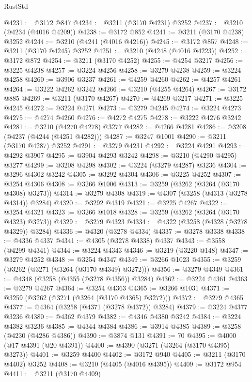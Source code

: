 \begin{lexlean}{RustStd}
\begin{coremodule}
@4231 := @3172 @847
@4234 := @3211 (@3170 @4231) @3252
@4237 := @3210 (@4234 (@4016 @4209))
@4238 := @3172 @852
@4241 := @3211 (@3170 @4238) @3252
@4244 := @3210 (@4241 (@4016 @4216))
@4245 := @3172 @857
@4248 := @3211 (@3170 @4245) @3252
@4251 := @3210 (@4248 (@4016 @4223))
@4252 := @3172 @872
@4254 := @3211 (@3170 @4252)
@4255 := @4254 @3217
@4256 := @3225 @4238
@4257 := @3224 @4256
@4258 := @3279 @4238
@4259 := @3224 @4258
@4260 := @3906 @3237
@4261 := @4259 @4260
@4262 := @4257 @4261
@4264 := @3222 @4262 @3242
@4266 := @3210 (@4255 @4264)
@4267 := @3172 @885
@4269 := @3211 (@3170 @4267)
@4270 := @4269 @3217
@4271 := @3225 @4245
@4272 := @3224 @4271
@4273 := @3279 @4245
@4274 := @3224 @4273
@4275 := @4274 @4260
@4276 := @4272 @4275
@4278 := @3222 @4276 @3242
@4281 := @3210 (@4270 @4278) @3277
@4282 := @4266 @4281
@4286 := @3208 (@4237 (@4244 (@4251 @4282)))
@4287 := @3247 @1001
@4290 := @3211 (@3170 @4287) @3252
@4291 := @3279 @4231
@4292 := @3224 @4291
@4293 := @4292 @3907
@4295 := @3904 @4293 @3242
@4298 := @3210 (@4290 @4295) @3277
@4299 := @3208 @4298
@4302 := @3224 (@3279 @4287) @3236
@4304 := @3296 @4302 @3242
@4305 := @3292 @4304
@4306 := @3225 @4252
@4307 := @3254 @4306
@4308 := @3266 @1006
@4313 := @3259 (@3262 (@3264 (@3170 @4308) @3273))
@4314 := @3279 @4308
@4319 := @4307 (@3258 (@4313 (@3278 @4314)) @3284)
@4320 := @3292 @4319
@4321 := @3225 @4267
@4322 := @3254 @4321
@4323 := @3266 @1018
@4328 := @3259 (@3262 (@3264 (@3170 @4323) @3273))
@4329 := @3279 @4323
@4334 := @4322 (@3258 (@4328 (@3278 @4329)) @3284)
@4336 := @4320 (@3278 @4334)
@4337 := @3278 @3338
@4338 := @4336 @4337
@4341 := @4305 (@3278 @4338) @4337
@4343 := @3558 (@4299 @4341)
@4344 := @3224 @4343
@4346 := @3219 (@3220 @148)
@4347 := @3279 @4252
@4348 := @3254 @4347
@4349 := @3266 @1023
@4355 := @3259 (@3262 (@3271 (@3264 (@3170 @4349) @3272)))
@4356 := @3279 @4349
@4361 := @4348 (@3258 (@4355 (@3278 @4356)) @3284)
@4362 := @3224 @4361
@4363 := @3279 @4267
@4364 := @3254 @4363
@4365 := @3266 @1031
@4371 := @3259 (@3262 (@3271 (@3264 (@3170 @4365) @3272)))
@4372 := @3279 @4365
@4377 := @4364 (@3258 (@4371 (@3278 @4372)) @3284)
@4379 := @3224 @4377 @3236
@4380 := @4362 @4379
@4382 := @4346 @4380 @3242
@4384 := @3224 @4382 @3236
@4385 := @4344 @4384
@4386 := @3914 @4385
@4389 := @3258 (@4230 (@4286 @4386))
@4390 := @3874 @131
@4391 := 70
@4395 := @4000 (@17 @4391 (@20 @4391))
@4400 := @4390 (@3271 (@3264 (@3170 @4395) @3273))
@4401 := @3259 @4400
@4402 := @3172 @940
@4405 := @3211 (@3170 @4402) @3252
@4408 := @3210 (@4405 (@4016 @4395))
@4409 := @3172 @954
@4411 := @3211 (@3170 @4409)

\end{coremodule}
\end{lexlean}

